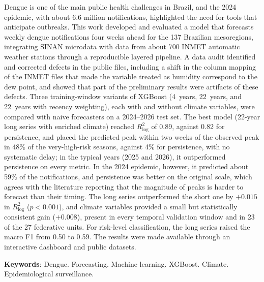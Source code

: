 \begin{resumo}[Abstract]
    Dengue is one of the main public health challenges in Brazil, and the 2024 epidemic, with about 6.6 million notifications, highlighted the need for tools that anticipate outbreaks. This work developed and evaluated a model that forecasts weekly dengue notifications four weeks ahead for the 137 Brazilian mesoregions, integrating SINAN microdata with data from about 700 INMET automatic weather stations through a reproducible layered pipeline. A data audit identified and corrected defects in the public files, including a shift in the column mapping of the INMET files that made the variable treated as humidity correspond to the dew point, and showed that part of the preliminary results were artifacts of these defects. Three training-window variants of XGBoost (4~years, 22~years, and 22~years with recency weighting), each with and without climate variables, were compared with naive forecasters on a 2024--2026 test set. The best model (22-year long series with enriched climate) reached $R^2_{\log}$ of 0.89, against 0.82 for persistence, and placed the predicted peak within two weeks of the observed peak in 48\% of the very-high-risk seasons, against 4\% for persistence, with no systematic delay; in the typical years (2025 and 2026), it outperformed persistence on every metric. In the 2024 epidemic, however, it predicted about 59\% of the notifications, and persistence was better on the original scale, which agrees with the literature reporting that the magnitude of peaks is harder to forecast than their timing. The long series outperformed the short one by $+0.015$ in $R^2_{\log}$ ($p < 0.001$), and climate variables provided a small but statistically consistent gain ($+0.008$), present in every temporal validation window and in 23 of the 27 federative units. For risk-level classification, the long series raised the macro F1 from 0.50 to 0.59. The results were made available through an interactive dashboard and public datasets.

     \vspace{\onelineskip}

     \noindent
     \textbf{Keywords}: Dengue. Forecasting. Machine learning. XGBoost. Climate. Epidemiological surveillance.
\end{resumo}
